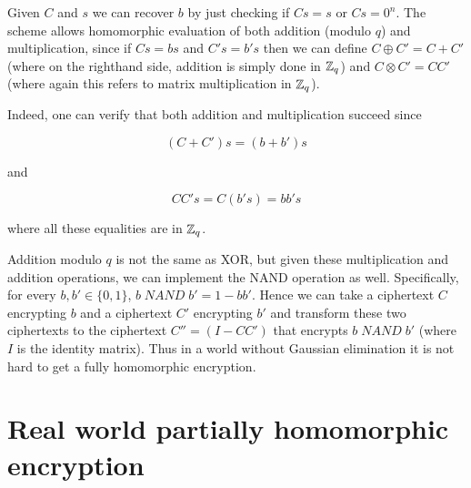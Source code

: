 Given \(C\) and \(s\) we can recover \(b\) by just checking if \(Cs=s\)
or \(Cs=0^n\). The scheme allows homomorphic evaluation of both addition
(modulo \(q\)) and multiplication, since if \(Cs = bs\) and \(C's=b's\)
then we can define \(C \oplus C' = C + C'\) (where on the righthand
side, addition is simply done in \({\mathbb{Z}}_q\)) and
\(C\otimes C' = \ensuremath{\mathit{CC}}'\) (where again this refers to
matrix multiplication in \({\mathbb{Z}}_q\)).

Indeed, one can verify that both addition and multiplication succeed
since

\[(C+C')s = (b+b')s\]

and

\[\ensuremath{\mathit{CC}}'s = C(b's) = bb's\]

where all these equalities are in \({\mathbb{Z}}_q\).

Addition modulo \(q\) is not the same as XOR, but given these
multiplication and addition operations, we can implement the NAND
operation as well. Specifically, for every \(b,b' \in \{0,1\}\),
\(b \; \ensuremath{\mathit{NAND}} \; b' = 1-bb'\). Hence we can take a
ciphertext \(C\) encrypting \(b\) and a ciphertext \(C'\) encrypting
\(b'\) and transform these two ciphertexts to the ciphertext
\(C''=(I-CC')\) that encrypts \(b\; \ensuremath{\mathit{NAND}} \; b'\)
(where \(I\) is the identity matrix). Thus in a world without Gaussian
elimination it is not hard to get a fully homomorphic encryption.

\hypertarget{privkeyfhe}{}

\section{Real world partially homomorphic
encryption}\label{Real-world-partially-homomorph}


